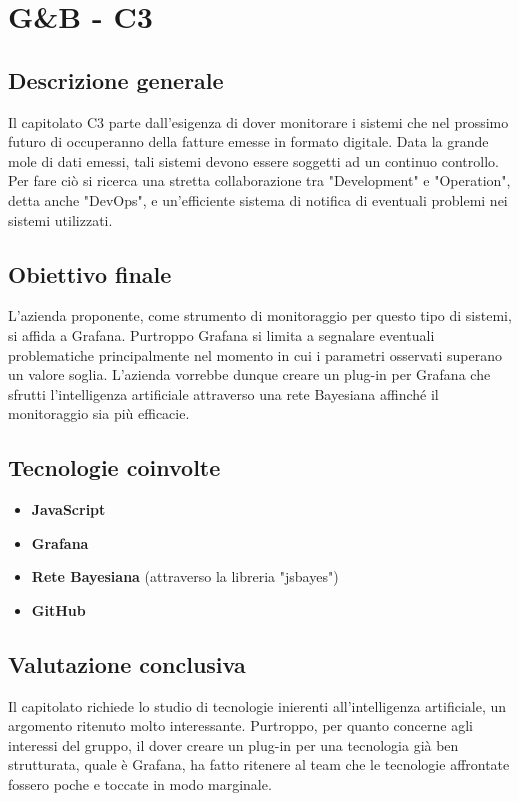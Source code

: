 \section{G\&B - C3} \label{c3}
    \subsection{Descrizione generale}
    Il capitolato C3 parte dall'esigenza di dover monitorare i sistemi che nel prossimo futuro di occuperanno della fatture emesse in formato digitale. Data la grande mole di dati emessi, tali sistemi devono essere soggetti ad un continuo controllo. Per fare ciò si ricerca una stretta collaborazione tra "Development" e "Operation", detta anche "DevOps", e un'efficiente sistema di notifica di eventuali problemi nei sistemi utilizzati.

    \subsection{Obiettivo finale}
    L'azienda proponente, come strumento di monitoraggio per questo tipo di sistemi, si affida a Grafana. Purtroppo Grafana si limita a segnalare eventuali problematiche principalmente nel momento in cui i parametri osservati superano un valore soglia. L'azienda vorrebbe dunque creare un plug-in per Grafana che sfrutti l'intelligenza artificiale attraverso una rete Bayesiana affinché il monitoraggio sia più efficacie.

    \subsection{Tecnologie coinvolte}
    \begin{itemize}
    	\item \textbf{JavaScript}
    	\item \textbf{Grafana}
    	\item \textbf{Rete Bayesiana} (attraverso la libreria "jsbayes")
    	\item \textbf{GitHub}
    \end{itemize}

    \subsection{Valutazione conclusiva}
    Il capitolato richiede lo studio di tecnologie inierenti all'intelligenza artificiale, un argomento ritenuto molto interessante. Purtroppo, per quanto concerne agli interessi del gruppo, il dover creare un plug-in per una tecnologia già ben strutturata, quale è Grafana, ha fatto ritenere al team che le tecnologie affrontate fossero poche e toccate in modo marginale.
